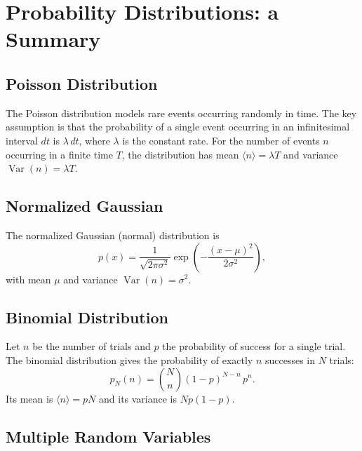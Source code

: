 \chapter{Probability Distributions: a Summary}

\section{Poisson Distribution}

The Poisson distribution models rare events occurring randomly in time. The key assumption is that the probability of a single event occurring in an infinitesimal interval $dt$ is $\lambda\,dt$, where $\lambda$ is the constant rate. For the number of events $n$ occurring in a finite time $T$, the distribution has mean $\langle n \rangle = \lambda T$ and variance $\operatorname{Var}(n) = \lambda T$.

\section{Normalized Gaussian}

\begin{definition}
The normalized Gaussian (normal) distribution is
\begin{equation}
    p(x) = \frac{1}{\sqrt{2\pi\sigma^2}}\exp\!\left(-\frac{(x-\mu)^2}{2\sigma^2}\right),
\end{equation}
with mean $\mu$ and variance $\operatorname{Var}(n) = \sigma^2$.
\end{definition}

\section{Binomial Distribution}

\begin{definition}
Let $n$ be the number of trials and $p$ the probability of success for a single trial. The binomial distribution gives the probability of exactly $n$ successes in $N$ trials:
\begin{equation}
    p_N(n) = \binom{N}{n}(1-p)^{N-n}\,p^n.
\end{equation}
Its mean is $\langle n \rangle = pN$ and its variance is $Np(1-p)$.
\end{definition}

\section{Multiple Random Variables}

